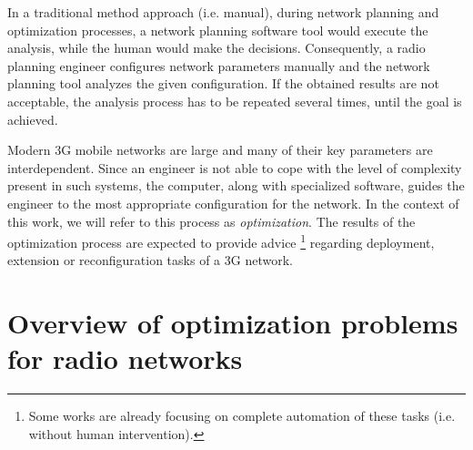 In a traditional method approach (i.e. manual), during network planning
and optimization processes, a network planning software tool would
execute the analysis, while the human would make the decisions. Consequently,
a radio planning engineer configures network parameters manually and
the network planning tool analyzes the given configuration. If the
obtained results are not acceptable, the analysis process has to be
repeated several times, until the goal is achieved.

Modern 3G mobile networks are large and many of their key parameters
are interdependent. Since an engineer is not able to cope with the
level of complexity present in such systems, the computer, along with
specialized software, guides the engineer to the most appropriate
configuration for the network. In the context of this work, we will
refer to this process as \emph{optimization}. The results of the optimization
process are expected to provide advice%
\footnote{Some works are already focusing on complete automation of these tasks
(i.e. without human intervention).%
} regarding deployment, extension or reconfiguration tasks of a 3G
network.


\section{Overview of optimization problems for radio networks}

